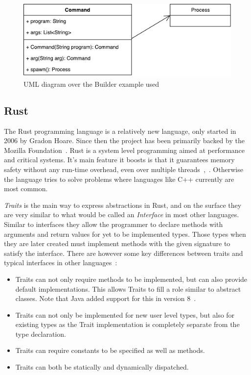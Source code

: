 \documentclass[conference]{IEEEtran}
\begin{document}
\begin{figure}[htpb]
    \centering
    \includegraphics[width=0.8\linewidth]{builder-ex.pdf}
    \caption{UML diagram over the Builder example used}
    \label{fig:builder-uml}
\end{figure}

\subsection{Rust}
\label{sub:rust}
The Rust programming language is a relatively new language, only started in 2006 by Gradon Hoare.
Since then the project has been primarily backed by the Mozilla Foundation~\cite{rustorg2017:faq}.
Rust is a system level programming aimed at performance and critical systems.
It's main feature it boosts is that it guarantees memory safety without any run-time overhead, even over multiple threads~\cite{matsakis:2014:rustlang},~\cite{reed2015:proof}.
Otherwise the language tries to solve problems where languages like C++ currently are most common.

\emph{Traits} is the main way to express abstractions in Rust, and on the surface they are very similar to what would be called an \emph{Interface} in most other languages.
Similar to interfaces they allow the programmer to declare methods with arguments and return values for yet to be implemented types.
Those types when they are later created must implement methods with the given signature to satisfy the interface.
There are however some key differences between traits and typical interfaces in other languages~\cite{rustblog2015:traits}:

\begin{itemize}
    \item
        Traits can not only require methods to be implemented, but can also provide default implementations. This allows Traits to fill a role similar to abstract classes.
        Note that Java added support for this in version 8~\cite{oracle:java_default}.
    \item
        Traits can not only be implemented for new user level types, but also for existing types as the Trait implementation is completely separate from the type declaration.
    \item
        Traits can require constants to be specified as well as methods.
    \item
        Traits can both be statically and dynamically dispatched.
\end{itemize}
\end{document}
